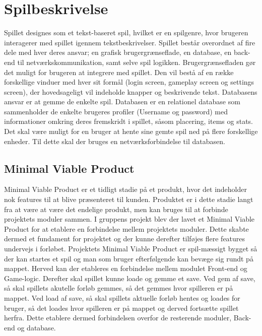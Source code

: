 \newpage

\section{Spilbeskrivelse}

Spillet designes som et tekst-baseret spil, hvilket er en spilgenre, hvor brugeren interagerer med spillet igennem tekstbeskrivelser. Spillet består overordnet af fire dele med hver deres ansvar; en grafisk brugergrænseflade, en database, en back-end til netværkskommunikation, samt selve spil logikken. Brugergrænsefladen gør det muligt for brugeren at integrere med spillet. Den vil bestå af en række forskellige vinduer med hver sit formål (login screen, gameplay screen og settings screen), der hovedsageligt vil indeholde knapper og beskrivende tekst. Databasens ansvar er at gemme de enkelte spil. Databasen er en relationel database som sammenholder de enkelte brugeres profiler (Username og password) med informationer omkring deres fremskridt i spillet, såsom placering, items og stats. Det skal være muligt for en bruger at hente sine gemte spil ned på flere forskellige enheder. Til dette skal der bruges en netværksforbindelse til databasen.   
\subsection{Minimal Viable Product}
\label{ssec:MVP}
Minimal Viable Product er et tidligt stadie på et produkt, hvor det indeholder nok features til at blive præsenteret til kunden. Produktet er i dette stadie langt fra at være at være det endelige produkt, men kan bruges til at forbinde projektets moduler sammen.
I gruppens projekt blev der lavet et Minimal Viable Product for at etablere en forbindelse mellem projektets moduler. Dette skabte dermed et fundament for projektet og der kunne derefter tilføjes flere features undervejs i forløbet.
Projektets Minimal Viable Product er spil-mæssigt bygget så der kan startes et spil og man som bruger efterfølgende kan bevæge sig rundt på mappet. Herved kan der etableres en forbindelse mellem modulet Front-end og Game-logic. Derefter skal spillet kunne loade og gemme et save. Ved gem af save, så skal spillets akutelle forløb gemmes, så det gemmes hvor spilleren er på mappet. Ved load af save, så skal spillets aktuelle forløb hentes og loades for bruger, så det loades hvor spilleren er på mappet og derved fortsætte spillet herfra. Dette etablere dermed forbindelsen overfor de resterende moduler, Back-end og database. 


